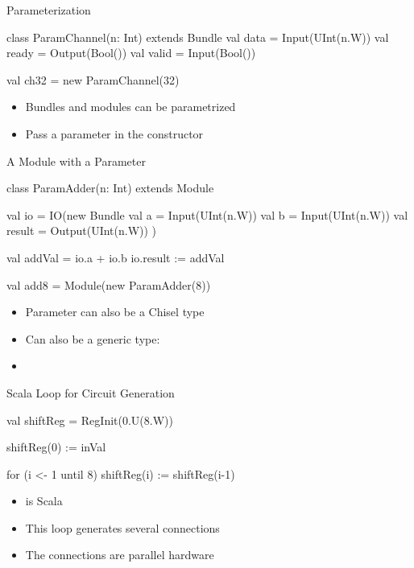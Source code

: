 \begin{frame}[fragile]{Parameterization}
\begin{chisel}
class ParamChannel(n: Int) extends Bundle {
  val data = Input(UInt(n.W))
  val ready = Output(Bool())
  val valid = Input(Bool())
}

val ch32 = new ParamChannel(32)
\end{chisel}
\begin{itemize}
\item Bundles and modules can be parametrized
\item Pass a parameter in the constructor
\end{itemize}

\end{frame}
\begin{frame}[fragile]{A Module with a Parameter}
\begin{chisel}
class ParamAdder(n: Int) extends Module {
  val io = IO(new Bundle {
    val a = Input(UInt(n.W))
    val b = Input(UInt(n.W))
    val result = Output(UInt(n.W))
  })

  val addVal = io.a + io.b
  io.result := addVal
}

val add8 = Module(new ParamAdder(8))
\end{chisel}
\begin{itemize}
\item Parameter can also be a Chisel type
\item Can also be a generic type:
\item {}
\end{itemize}
\end{frame}

\begin{frame}[fragile]{Scala  Loop for Circuit Generation}
\begin{chisel}
val shiftReg = RegInit(0.U(8.W))

shiftReg(0) := inVal

for (i <- 1 until 8) {
  shiftReg(i) := shiftReg(i-1)
}
\end{chisel}
\begin{itemize}
\item {} is Scala
\item This loop generates several connections
\item The connections are parallel hardware
\end{itemize}
\end{frame}


